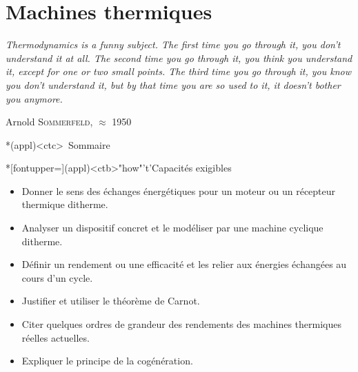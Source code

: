 \documentclass[../../main/main.tex]{subfiles}
\begin{document}
\setcounter{chapter}{4}


\chapter{Machines thermiques}
\epigraph{\openquote\textit{%
		Thermodynamics is a funny subject. The first time you go through it, you
		don't understand it at all. The second time you go through it, you think you
		understand it, except for one or two small points. The third time you go
		through it, you know you don't understand it, but by that time you are so
		used to it, it doesn't bother you anymore.
	}%
	\closequote}{Arnold \textsc{Sommerfeld}, $\approx$ 1950}

\vspace*{\fill}

\begin{tcn}*(appl)<ctc>{\iconsomm~Sommaire}
	\let\item\olditem
	\vspace{-15pt}
	\minitoc
	\vspace{-25pt}
\end{tcn}

\begin{tcn}*[fontupper=\small](appl)<ctb>"how"'t'{Capacités exigibles}
	\begin{itemize}[label=\rcheck]
		\item Donner le sens des échanges énergétiques pour un moteur ou un
		      récepteur thermique ditherme.

		\item Analyser un dispositif concret et le modéliser par une machine
		      cyclique ditherme.

		\item Définir un rendement ou une efficacité et les relier aux énergies
		      échangées au cours d'un cycle.

		\item Justifier et utiliser le théorème de Carnot.

		\item Citer quelques ordres de grandeur des rendements des machines
		      thermiques réelles actuelles.

		\item Expliquer le principe de la cogénération.
	\end{itemize}
\end{tcn}

\vspace*{\fill}
\end{document}
